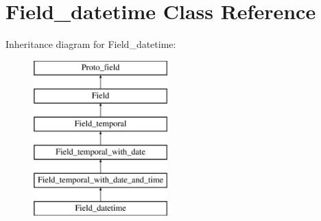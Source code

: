 \hypertarget{classField__datetime}{}\section{Field\+\_\+datetime Class Reference}
\label{classField__datetime}
Inheritance diagram for Field\+\_\+datetime\+:\begin{figure}[H]
\begin{center}
\leavevmode
\includegraphics[height=6.000000cm]{classField__datetime}
\end{center}
\end{figure}
